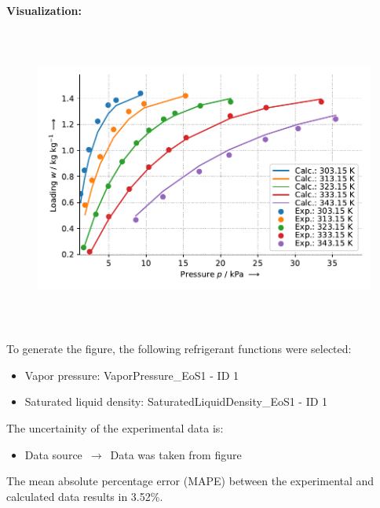 \textbf{Visualization:}
%
\begin{figure}[!htp]
{\noindent\includegraphics[height=10cm, keepaspectratio]{figs/ads/ads_Ethanol_phenol_resin_composite_KOH4-PR_DubininAstakhov_1.pdf}}
\end{figure}
%

To generate the figure, the following refrigerant functions were selected:
\begin{itemize}
\item Vapor pressure: VaporPressure\_EoS1 - ID 1
\item Saturated liquid density: SaturatedLiquidDensity\_EoS1 - ID 1
\end{itemize}

The uncertainity of the experimental data is:
\begin{itemize}
\item Data source $\,\to\,$ Data was taken from figure
\end{itemize}

The mean absolute percentage error (MAPE) between the experimental and calculated data results in 3.52\%.
\FloatBarrier
\newpage
